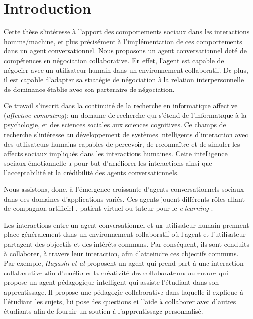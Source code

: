 \chapter{Introduction}


Cette thèse s'intéresse à l'apport des comportements sociaux dans les interactions homme/machine, et plus précisément à l'implémentation de ces comportements dans un agent conversationnel. Nous proposons un agent conversationnel doté de compétences en négociation collaborative. En effet, l'agent est capable de négocier avec un utilisateur humain dans un environnement collaboratif. De plus, il est capable d'adapter sa stratégie de négociation à la relation interpersonnelle de dominance établie avec son partenaire de négociation. 


Ce travail s'inscrit dans la continuité de la recherche en informatique affective (\emph{affective computing}): un domaine de recherche qui s'étend de l'informatique à la psychologie, et des sciences sociales aux sciences cognitives. Ce champs de recherche s'intéresse au développement de systèmes intelligents d'interaction avec des utilisateurs humains capables de percevoir, de reconnaître et de simuler les affects sociaux impliqués dans les interactions humaines. Cette intelligence sociaux-émotionnelle a pour but d'améliorer les interactions ainsi que l'acceptabilité et la crédibilité des agents conversationnels. 

Nous assistons, donc, à l'émergence croissante d'agents conversationnels sociaux dans des domaines d'applications variés.  Ces agents jouent différents rôles allant de compagnon artificiel \cite{ring2013addressing,sidner2013always}, patient virtuel\cite{kenny2007virtual,kleinheksel2017virtual} ou tuteur pour le \emph{e-learning} \cite{kerly2008calmsystem,kerry2009conversational}.

Les interactions entre un agent conversationnel et un utilisateur humain prennent place généralement dans un environnement collaboratif où l'agent et l'utilisateur partagent des objectifs et des intérêts communs. 
Par conséquent, ils sont conduits à collaborer, à travers leur interaction, afin d'atteindre ces objectifs communs. 
Par exemple, \emph{Hayashi et al} proposent un agent qui prend part à une interaction collaborative afin d'améliorer la créativité des collaborateurs \cite{hayashi2013embodied} ou encore \cite{soliman2010intelligent} qui propose un agent pédagogique intelligent qui assiste  l'étudiant dans son apprentissage. Il propose une pédagogie collaborative dans laquelle il explique à l'étudiant les sujets, lui pose des questions et l'aide à collaborer avec d'autres étudiants afin de fournir un soutien à l'apprentissage personnalisé.

